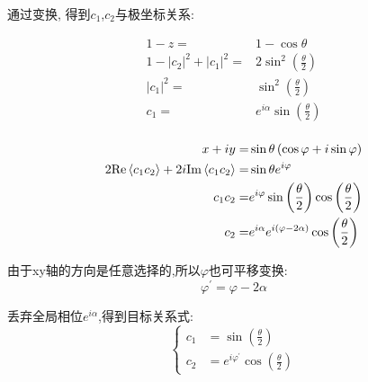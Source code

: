 \documentclass[twoside]{article}
\begin{document}
通过变换, 得到$c_1$,$c_2$与极坐标关系:

\begin{equation}
    \begin{split}
        1 - z =                 & 1 - \cos\theta                               \\
        1 - |c_2|^2 + |c_1|^2 = & 2 \sin^2\left(\frac{\theta}{2}\right)        \\
        |c_1|^2  =              & \sin^2\left(\frac{\theta}{2}\right)          \\
        c_1  =                  & e^{i\alpha}\sin\left(\frac{\theta}{2}\right) \\
    \end{split}
\end{equation}

\begin{equation}
    \begin{split}
        x + iy =                                                     & \sin\theta \left(\cos \varphi +i\sin\varphi\right)                              \\
        2\text{Re}\braket{c_1 c_2} + 2i \text{Im} \braket{c_1 c_2} = & \sin\theta e^{i\varphi}                                                         \\
        c_1 c_2 =                                                    & e^{i\varphi} \sin\left(\frac{\theta}{2}\right)\cos\left(\frac{\theta}{2}\right) \\
        c_2 =                                                        & e^{i\alpha} e^{i(\varphi-2\alpha)}\cos\left(\frac{\theta}{2}\right)             \\
    \end{split}
\end{equation}

由于xy轴的方向是任意选择的,所以$\varphi$也可平移变换:
\begin{equation}
    \varphi^\prime = \varphi - 2\alpha
\end{equation}

丢弃全局相位$e^{i\alpha}$,得到目标关系式:
\begin{equation}
    \begin{cases}
        c_1 & = \sin\left(\frac{\theta}{2}\right)                    \\
        c_2 & = e^{i\varphi^\prime}\cos\left(\frac{\theta}{2}\right)
    \end{cases}
\end{equation}
\end{document}
